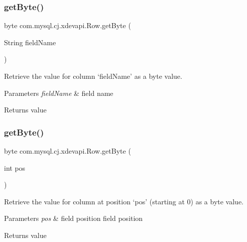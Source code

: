 \subsubsection{\texorpdfstring{get\+Byte()}{getByte()}\hspace{0.1cm}{\footnotesize\ttfamily [1/2]}}
{\footnotesize\ttfamily byte com.\+mysql.\+cj.\+xdevapi.\+Row.\+get\+Byte (\begin{DoxyParamCaption}\item[{String}]{field\+Name }\end{DoxyParamCaption})}

Retrieve the value for column `field\+Name' as a byte value.


\begin{DoxyParams}{Parameters}
{\em field\+Name} & field name \\
\hline
\end{DoxyParams}
\begin{DoxyReturn}{Returns}
value 
\end{DoxyReturn}
\mbox{\label{interfacecom_1_1mysql_1_1cj_1_1xdevapi_1_1_row_a212afbaef90eab08bafff869c13acdac}} 
\subsubsection{\texorpdfstring{get\+Byte()}{getByte()}\hspace{0.1cm}{\footnotesize\ttfamily [2/2]}}
{\footnotesize\ttfamily byte com.\+mysql.\+cj.\+xdevapi.\+Row.\+get\+Byte (\begin{DoxyParamCaption}\item[{int}]{pos }\end{DoxyParamCaption})}

Retrieve the value for column at position `pos' (starting at 0) as a byte value.


\begin{DoxyParams}{Parameters}
{\em pos} & field position field position \\
\hline
\end{DoxyParams}
\begin{DoxyReturn}{Returns}
value 
\end{DoxyReturn}
\mbox{\label{interfacecom_1_1mysql_1_1cj_1_1xdevapi_1_1_row_adf47f80156d2ff52d9cf7fc9fde20718}} 
